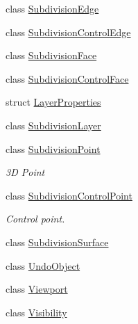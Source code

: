 \begin{DoxyCompactItemize}
class \hyperlink{classShipCAD_1_1SubdivisionEdge}{Subdivision\-Edge}
\item 
class \hyperlink{classShipCAD_1_1SubdivisionControlEdge}{Subdivision\-Control\-Edge}
\item 
class \hyperlink{classShipCAD_1_1SubdivisionFace}{Subdivision\-Face}
\item 
class \hyperlink{classShipCAD_1_1SubdivisionControlFace}{Subdivision\-Control\-Face}
\item 
struct \hyperlink{structShipCAD_1_1LayerProperties}{Layer\-Properties}
\item 
class \hyperlink{classShipCAD_1_1SubdivisionLayer}{Subdivision\-Layer}
\item 
class \hyperlink{classShipCAD_1_1SubdivisionPoint}{Subdivision\-Point}
\begin{DoxyCompactList}\small\item\em 3\-D Point \end{DoxyCompactList}\item 
class \hyperlink{classShipCAD_1_1SubdivisionControlPoint}{Subdivision\-Control\-Point}
\begin{DoxyCompactList}\small\item\em Control point. \end{DoxyCompactList}\item 
class \hyperlink{classShipCAD_1_1SubdivisionSurface}{Subdivision\-Surface}
\item 
class \hyperlink{classShipCAD_1_1UndoObject}{Undo\-Object}
\item 
class \hyperlink{classShipCAD_1_1Viewport}{Viewport}
\item 
class \hyperlink{classShipCAD_1_1Visibility}{Visibility}
\end{DoxyCompactItemize}
